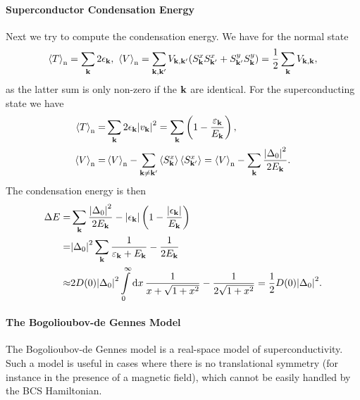 \paragraph{Superconductor Condensation Energy}
Next we try to compute the condensation energy. We have for the normal state
\begin{align*}
	\expval{T}_{\text{n}} = \sum\limits_{\vb{k}}2\epsilon_{\vb{k}},\ \expval{V}_{\text{n}} = \sum\limits_{\vb{k}, \vb{k}\p}V_{\vb{k}, \vb{k}\p}(S_{\vb{k}}^{x}S_{\vb{k}\p}^{x} + S_{\vb{k}\p}^{y}S_{\vb{k}}^{y}) = \frac{1}{2}\sum\limits_{\vb{k}}V_{\vb{k}, \vb{k}},
\end{align*}
as the latter sum is only non-zero if the $\vb{k}$ are identical. For the superconducting state we have
\begin{align*}
	\expval{T}_{\text{n}} =& \sum\limits_{\vb{k}}2\epsilon_{\vb{k}}\abs{v_{\vb{k}}}^{2} = \sum\limits_{\vb{k}}\left(1 - \frac{\varepsilon_{\vb{k}}}{E_{\vb{k}}}\right), \\
	\expval{V}_{\text{n}} =& \expval{V}_{\text{n}} - \sum\limits_{\vb{k} \neq \vb{k}^{\prime}}\expval{S_{\vb{k}}^{x}}\expval{S_{\vb{k}\ensuremath{^{\prime}}}^{x}} = \expval{V}_{\text{n}} - \sum\limits_{\vb{k}}\frac{\abs{\Delta_{0}}^{2}}{2E_{\vb{k}}}.
\end{align*}
The condensation energy is then
\begin{align*}
	\Delta E =& \sum\limits_{\vb{k}}\frac{\abs{\Delta_{0}}^{2}}{2E_{\vb{k}}} - \abs{\epsilon_{\vb{k}}}\left(1 - \frac{\abs{\epsilon_{\vb{k}}}}{E_{\vb{k}}}\right) \\
	         =& \abs{\Delta_{0}}^{2}\sum\limits_{\vb{k}}\frac{1}{\varepsilon_{\vb{k}} + E_{\vb{k}}} - \frac{1}{2E_{\vb{k}}} \\
	   \approx& 2D(0)\abs{\Delta_{0}}^{2}\int\limits_{0}^{\infty}\dd{x}\frac{1}{x + \sqrt{1 + x^{2}}} - \frac{1}{2\sqrt{1 + x^{2}}} = \frac{1}{2}D(0)\abs{\Delta_{0}}^{2}.
\end{align*}

\paragraph{The Bogolioubov-de Gennes Model}
The Bogolioubov-de Gennes model is a real-space model of superconductivity. Such a model is useful in cases where there is no translational symmetry (for instance in the presence of a magnetic field), which cannot be easily handled by the BCS Hamiltonian.

